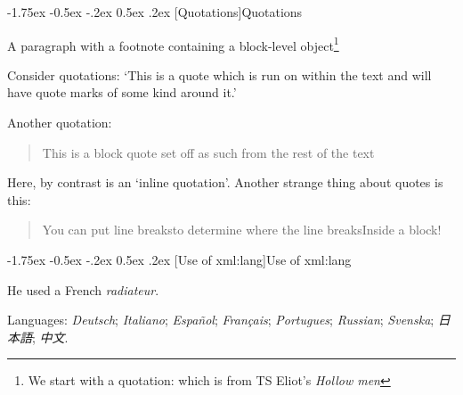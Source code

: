 \documentclass[11pt,twoside]{article}\makeatletter
\makeatletter
\renewcommand\section{\@startsection {section}{1}{\z@}%
     {-1.75ex \@plus -0.5ex \@minus -.2ex}%
     {0.5ex \@plus .2ex}%
     {\reset@font\Large\bfseries\sffamily}}
\makeatother
\begin{document}
\section[Quotations]{Quotations}\par
A paragraph with a footnote containing a block-level object\footnote{We start with a quotation:
 which is from TS Eliot's \textit{Hollow men}}\par
Consider quotations: ‘This is a quote which is run on within the text and will have quote marks of some kind around it.’\par
Another quotation: \begin{quote}This is a block quote set off as such from the rest of the text\end{quote}\par
Here, by contrast is an ‘inline quotation’. Another strange thing about quotes is this: \begin{quote}You can put line breaks{\hskip1pt}\newline to determine where the line breaks{\hskip1pt}\newline Inside a block!\end{quote}
\section[Use of xml:lang]{Use of xml:lang}\par
He used a French \textit{radiateur}.\par
Languages: \textit{Deutsch}; \textit{Italiano}; \textit{Español}; \textit{Français}; \textit{Portugues}; \textit{Russian}; \textit{Svenska}; \textit{日本語}; \textit{中文}.
\end{document}
